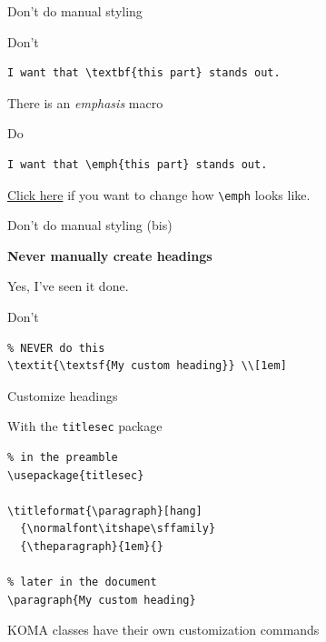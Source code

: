 \documentclass[xetex, onlymath, handout]{beamer}
\begin{document}
\begin{frame}[fragile]{Don't do manual styling}

  \begin{alertblock}{Don't}
    \begin{lstlisting}
I want that \textbf{this part} stands out.
    \end{lstlisting}
  \end{alertblock}

  There is an \emph{emphasis} macro

  \begin{block}{Do}
    \begin{lstlisting}
I want that \emph{this part} stands out.
    \end{lstlisting}
  \end{block}

  \href{https://github.com/HSR-Stud/Willkommen/blob/master/Guidelines.md#text-and-structure}{Click here} if you want to change how \lstinline!\emph! looks like.

\end{frame}

\begin{frame}[fragile]{Don't do manual styling (bis)}

  {\LARGE \bfseries Never manually create headings}
  
  Yes, I've seen it done.

  \begin{alertblock}{Don't}
    \begin{lstlisting}
% NEVER do this
\textit{\textsf{My custom heading}} \\[1em]
    \end{lstlisting}
  \end{alertblock}

\end{frame}

\begin{frame}[fragile]{Customize headings}

  \begin{exampleblock}{With the \texttt{titlesec} package}
    \begin{lstlisting}
% in the preamble
\usepackage{titlesec}

\titleformat{\paragraph}[hang]
  {\normalfont\itshape\sffamily}
  {\theparagraph}{1em}{}

% later in the document
\paragraph{My custom heading}
    \end{lstlisting}
  \end{exampleblock}

  \begin{block}{}
    KOMA classes have their own customization commands
  \end{block}
\end{frame}
\end{document}
